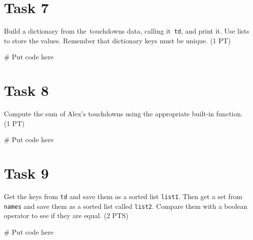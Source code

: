 \documentclass[
  letterpaper,
  DIV=11,
  numbers=noendperiod]{scrreprt}
\newenvironment{Shaded}{\begin{snugshade}}{\end{snugshade}}
\newcommand{\CommentTok}[1]{\textcolor[rgb]{0.37,0.37,0.37}{#1}}
\begin{document}
\hypertarget{task-7}{%
\section{Task 7}\label{task-7}}

Build a dictionary from the~touchdowns data, calling it~\texttt{td}, and
print it. Use lists to store the values. Remember that dictionary keys
must be unique. (1 PT)

\begin{Shaded}
\begin{Highlighting}[]
\CommentTok{\# Put code here}
\end{Highlighting}
\end{Shaded}

\hypertarget{task-8}{%
\section{Task 8}\label{task-8}}

Compute the sum of Alex's touchdowns using the appropriate built-in
function. (1 PT)

\begin{Shaded}
\begin{Highlighting}[]
\CommentTok{\# Put code here}
\end{Highlighting}
\end{Shaded}

\hypertarget{task-9}{%
\section{Task 9}\label{task-9}}

Get the keys from \texttt{td} and save them as a sorted list
\texttt{list1}. Then get a set from \texttt{names} and save them as a
sorted list called \texttt{list2}. Compare them with a boolean operator
to see if they are equal. (2 PTS)

\begin{Shaded}
\begin{Highlighting}[]
\CommentTok{\# Put code here}
\end{Highlighting}
\end{Shaded}
\end{document}
